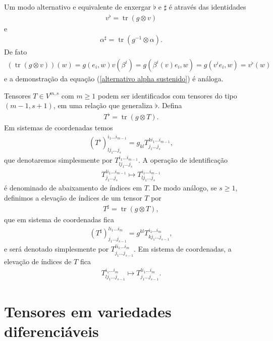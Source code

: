 \documentclass[10pt,reqno]{amsart}
\DeclareMathOperator{\tr}{tr}
\begin{document}
Um modo alternativo e equivalente de enxergar $\flat$ e $\sharp$ é através das identidades \begin{align}
\label{alternativo v bemol}
v^\flat = \tr( g \otimes v)
\end{align} 
e 
\begin{align}
\label{alternativo alpha sustenido}
\alpha^\sharp = \tr(g^{-1}\otimes \alpha).
\end{align}
De fato
\begin{align*}
(\tr (g \otimes v))(w)=g(e_i,w)v(\beta^i) = g(\beta^i (v) e_i,w) = g(v^i e_i, w) = v^\flat(w)
\end{align*}
e a demonstração da equação (\ref{alternativo alpha sustenido}) é análoga.

Tensores $T \in V^{m,s}$ com $m\geq 1$ podem ser identificados com tensores do tipo $(m-1,s+1)$, em uma relação que generaliza $\flat$.
Defina
\begin{align}
\label{T bemol}
T^\flat = \tr(g \otimes T).
\end{align}
Em sistemas de coordenadas temos
\begin{align*}
(T^\flat)^{i_1 \ldots i_{m-1}}_{l j_1 \ldots j_{s}}=g_{k l}T^{k i_1 \ldots i_{m-1}}_{j_1 \ldots j_{s}},
\end{align*}
que denotaremos simplesmente por $T^{i_1 \ldots i_{m-1}}_{l j_1 \ldots j_{s}}$.
A operação de identificação
\begin{align*}
T^{li_1 \ldots i_{m-1}}_{j_1 \ldots j_s} \mapsto T^{i_1 \ldots i_{m-1}}_{l j_1 \ldots j_s}
\end{align*}
é denominado de abaixamento de índices em $T$.
De modo análogo, se $s\geq 1$, definimos a elevação de índices de um tensor $T$ por
\begin{align*}
T^\sharp = \tr(g \otimes T),
\end{align*}
que em sistema de coordenadas fica
\begin{align*}
(T^\sharp)^{l i_1 \ldots i_m}_{j_1 \ldots j_{s-1}}=g^{k l}T^{i_1 \ldots i_m}_{k j_1 \ldots j_{s-1}},
\end{align*}
e será denotado simplesmente por $T^{l i_1 \ldots i_m}_{j_1 \ldots j_{s-1}}$.
Em sistema de coordenadas, a elevação de índices de $T$ fica
\begin{align*}
T^{i_1 \ldots i_m}_{l j_1 \ldots j_{s-1}} \mapsto T^{l i_1 \ldots i_m}_{j_1 \ldots j_{s-1}}.
\end{align*}

\section{Tensores em variedades diferenciáveis}
\end{document}
